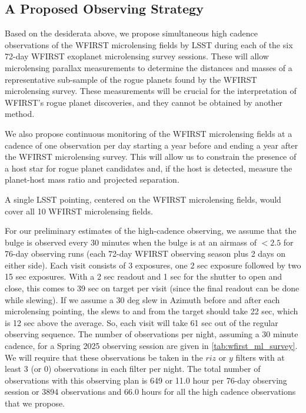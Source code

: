 
\subsection{A Proposed Observing Strategy}
\label{sec:\secname:proposal}

Based on the desiderata above, we
propose simultaneous high cadence observations of the WFIRST microlensing fields
by LSST during each
of the six 72-day WFIRST exoplanet microlensing survey sessions. These
will allow microlensing parallax measurements to determine the distances
and masses of a representative sub-sample of the rogue planets found by
the WFIRST microlensing survey. These measurements will be crucial for
the interpretation of WFIRST's rogue planet discoveries, and they
cannot be obtained by another method.

We also propose continuous monitoring of the WFIRST microlensing fields
at a cadence of one observation per day
starting a year before and ending a year after the WFIRST microlensing survey.
This will allow us to constrain the presence of a host star for rogue planet candidates and,
if the host is detected, measure the planet-host mass ratio and projected separation.

A single LSST pointing, centered on the WFIRST microlensing
fields, would cover all 10 WFIRST microlensing fields.

For our preliminary estimates of the high-cadence observing, we assume
that the bulge is observed every 30 minutes when the bulge is at
an airmass of $< 2.5$ for 76-day observing runs (each 72-day WFIRST observing
season plus 2 days on either side). Each visit consists of 3 exposures,
one 2 sec exposure followed by two 15 sec exposures. With a 2 sec readout
and 1 sec for the shutter to open and close, this comes to 39 sec on target
per visit (since the final readout can be done while slewing).
If we assume a 30 deg slew in Azimuth before and after each microlensing pointing, the slews
to and from the target should take 22 sec, which is 12 sec above the average. So,
each visit will take 61 sec out of the regular observing sequence.
The number of observations per night, assuming a 30 minute cadence, for
a Spring 2025 observing session are given in \autoref{tab:wfirst_ml_survey}. We will require
that these observations be taken in the $riz$ or $y$ filters with at
least 3 (or 0) observations in each filter per night. The total number
of observations with this observing plan is 649 or 11.0 hour per
76-day observing session or 3894 observations and 66.0 hours for
all the high cadence observations that we propose.

